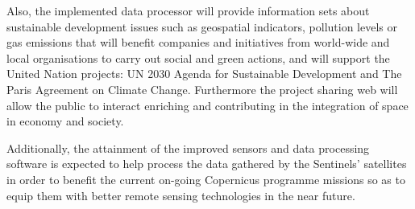 Also, the implemented data processor will provide information sets about sustainable development issues such as geospatial indicators, pollution levels or gas emissions that will benefit companies and initiatives from world-wide and local organisations to carry out social and green actions, and will support the United Nation projects: UN 2030 Agenda for Sustainable Development and The Paris Agreement on Climate Change. Furthermore the project sharing web will allow the public to interact enriching and contributing in the integration of space in economy and society.
 
Additionally, the attainment of the improved sensors and data processing software is expected to help process the data gathered by the Sentinels' satellites in order to benefit the current on-going Copernicus programme missions so as to equip them with better remote sensing technologies in the near future.  








